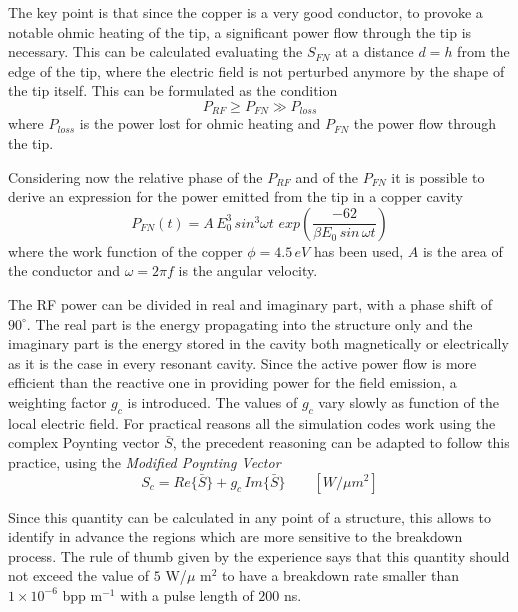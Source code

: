 The key point is that since the copper is a very good conductor, to provoke a notable ohmic heating of the tip, a significant power flow through the tip is necessary. This can be calculated evaluating the $S_{FN}$ at a distance $d=h$ from the edge of the tip, where the electric field is not perturbed anymore by the shape of the tip itself. This can be formulated as the condition 
\begin{equation}
P_{RF} \ge P_{FN} \gg P_{loss}
\end{equation}
where $P_{loss}$ is the power lost for ohmic heating and $P_{FN}$ the power flow through the tip.

Considering now the relative phase of the $P_{RF}$ and of the $P_{FN}$ it is possible to derive an expression for the power emitted from the tip in a copper cavity
\begin{equation}
P_{FN} (t) = A \, E^3_0 \, sin^3 \omega t \,  \, exp \left ( \frac{-62}{\beta E_0 \, sin \, \omega t} \right )
\end{equation}
where the work function of the copper $\phi = 4.5 \, eV$ has been used, $A$ is the area of the conductor and $\omega = 2 \pi f$ is the angular velocity.

The RF power can be divided in real and imaginary part, with a phase shift of $90^\circ$. The real part is the energy propagating into the structure only and the imaginary part is the energy stored in the cavity both magnetically or electrically as it is the case in every resonant cavity. Since the active power flow is more efficient than the reactive one in providing power for the field emission, a weighting factor $g_c$ is introduced. The values of $g_c$ vary slowly as function of the local electric field. For practical reasons all the simulation codes work using the complex Poynting vector $\bar{S}$, the precedent reasoning can be adapted to follow this practice, using the \textit{Modified Poynting Vector}
\begin{equation}
S_c = Re\{ \bar{S} \} + g_c \, Im \{ \bar{S} \} \qquad [W/\mu m^2]
\end{equation} 

Since this quantity can be calculated in any point of a structure, this allows to identify in advance the regions which are more sensitive to the breakdown process. The rule of thumb given by the experience says that this quantity should not exceed the value of $5$ W/$\mu$ m$^2$ to have a breakdown rate smaller than $1\times 10^{-6} $ bpp  m$^{-1}$ with a pulse length of $200$ ns.


